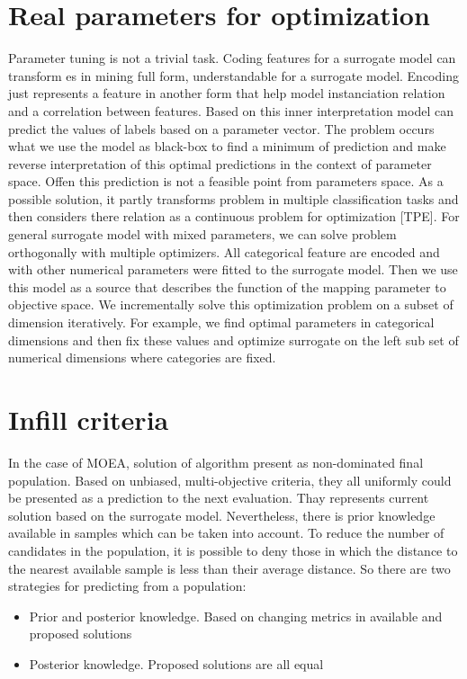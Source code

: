     \section{Real parameters for optimization}
    Parameter tuning is not a trivial task. Coding features for a surrogate model can transform es in mining full form, understandable for a surrogate model. Encoding just represents a feature in another form that help model instanciation relation and a correlation between features. Based on this inner interpretation model can predict the values of labels based on a parameter vector. The problem occurs what we use the model as black-box to find a minimum of prediction and make reverse interpretation of this optimal predictions in the context of parameter space. Offen this prediction is not a feasible point from parameters space. As a possible solution, it partly transforms problem in multiple classification tasks and then considers there relation as a continuous problem for optimization [TPE]. For general surrogate model with mixed parameters, we can solve problem orthogonally with multiple optimizers. All categorical feature are encoded and with other numerical parameters were fitted to the surrogate model. Then we use this model as a source that describes the function of the mapping parameter to objective space.  We incrementally solve this optimization problem on a subset of dimension iteratively. For example, we find optimal parameters in categorical dimensions and then fix these values and optimize surrogate on the left sub set of numerical dimensions where categories are fixed.


    \section{Infill criteria}
    In the case of MOEA, solution of algorithm present as non-dominated final population. Based on unbiased, multi-objective criteria, they all uniformly could be presented as a prediction to the next evaluation. Thay represents current solution based on the surrogate model. Nevertheless, there is prior knowledge available in samples which can be taken into account. To reduce the number of candidates in the population, it is possible to deny those in which the distance to the nearest available sample is less than their average distance.
    So there are two strategies for predicting from a population:
    \begin{itemize}
        \item Prior and posterior knowledge. Based on changing metrics in available and proposed solutions
        \item Posterior knowledge. Proposed solutions are all equal
    \end{itemize}


